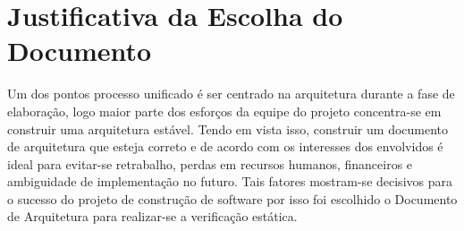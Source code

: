\chapter{Justificativa da Escolha do Documento}

Um dos pontos processo unificado é ser centrado na arquitetura durante a fase de elaboração, logo maior parte dos esforços da equipe do projeto concentra-se em construir uma arquitetura estável. 
Tendo em vista isso, construir um documento de arquitetura que esteja correto  e de acordo com os interesses dos envolvidos é ideal para evitar-se retrabalho, perdas em recursos humanos, financeiros e ambiguidade de implementação no futuro. 
Tais fatores mostram-se decisivos para o sucesso do projeto de construção de software por isso foi escolhido o Documento de Arquitetura para realizar-se a verificação estática. 
